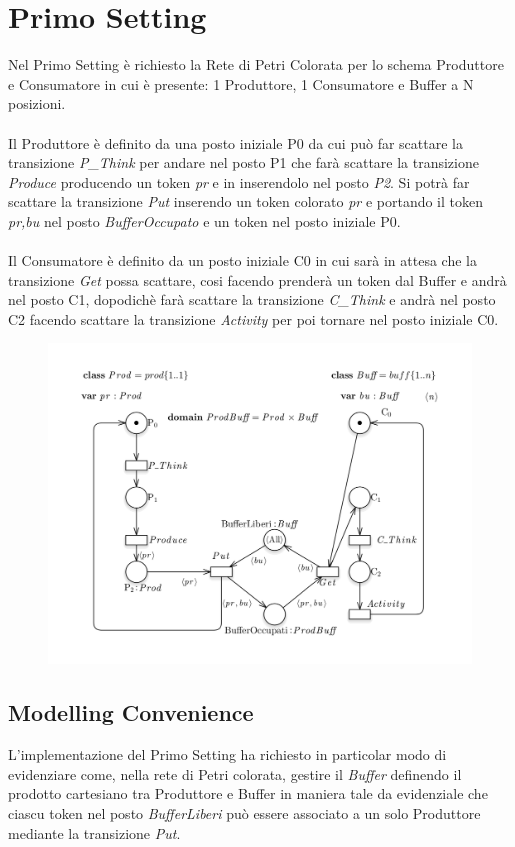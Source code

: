 \documentclass{article}
\begin{document}
\section{Primo Setting}
Nel Primo Setting è richiesto la Rete di Petri Colorata per lo schema Produttore e Consumatore in cui è presente: 1 Produttore, 1 Consumatore e Buffer a N posizioni.
\\\\Il Produttore è definito da una posto iniziale P0 da cui può far scattare la transizione \textit{P\_Think} per andare nel posto P1 che farà scattare la transizione \textit{Produce} producendo un token \textit{pr} e in inserendolo nel posto \textit{P2}. Si potrà far scattare la transizione \textit{Put} inserendo un token colorato \textit{pr} e portando il token \textit{pr,bu} nel posto \textit{BufferOccupato} e un token nel posto iniziale P0.
\\\\Il Consumatore è definito da un posto iniziale C0 in cui sarà in attesa che la transizione \textit{Get} possa scattare, cosi facendo prenderà un token dal Buffer e andrà nel posto C1, dopodichè farà scattare la transizione \textit{C\_Think} e andrà nel posto C2 facendo scattare la transizione \textit{Activity} per poi tornare nel posto iniziale C0.
\begin{figure}[h] 
\centering
\includegraphics[scale=0.4]{Setting1def-2.png}
\end{figure}
\subsection{Modelling Convenience}
L'implementazione del Primo Setting ha richiesto in particolar modo di evidenziare come, nella rete di Petri colorata, gestire il \textit{Buffer} definendo il prodotto cartesiano tra Produttore e Buffer in maniera tale da evidenziale che ciascu token nel posto \textit{BufferLiberi} può essere associato a un solo Produttore mediante la transizione \textit{Put}.
\end{document}

